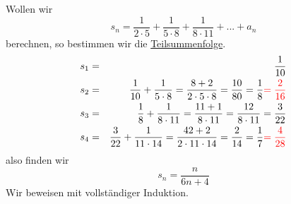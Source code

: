 \documentclass{report}
\begin{document}
Wollen wir
\begin{equation*}s_n = \frac{1}{2 \cdot 5} + \frac{1}{5 \cdot 8} + \frac{1}{8 \cdot 11} + ... + a_n\end{equation*}
berechnen, so bestimmen wir die \underline{Teilsummenfolge}.
\begin{eqnarray}s_1 & = & \frac{1}{10}\\
s_2 & = & \frac{1}{10} + \frac{1}{5 \cdot 8} = \frac{8 + 2}{2 \cdot 5 \cdot 8} = \frac{10}{80} = \frac{1}{8} \textcolor{red}{ = \frac{2}{16}}\\
s_3 & = & \frac{1}{8} + \frac{1}{8 \cdot 11} = \frac{11 + 1}{8 \cdot 11} = \frac{12}{8 \cdot 11} = \frac{3}{22}\\
s_4 & = & \frac{3}{22} + \frac{1}{11 \cdot 14} = \frac{42 + 2}{2 \cdot 11 \cdot 14} = \frac{2}{14} = \frac{1}{7} \textcolor{red}{ = \frac{4}{28}}\end{eqnarray}
also finden wir
\begin{equation*}s_n = \frac{n}{6n + 4}\end{equation*}
Wir beweisen mit vollständiger Induktion.
\end{document}
